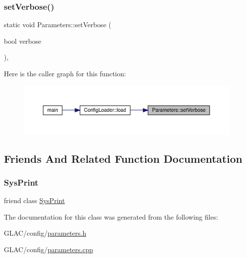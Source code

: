 \subsubsection{\texorpdfstring{setVerbose()}{setVerbose()}}
{\footnotesize\ttfamily static void Parameters\+::set\+Verbose (\begin{DoxyParamCaption}\item[{bool}]{verbose }\end{DoxyParamCaption})\hspace{0.3cm}{\ttfamily [inline]}, {\ttfamily [static]}}

Here is the caller graph for this function\+:\nopagebreak
\begin{figure}[H]
\begin{center}
\leavevmode
\includegraphics[width=350pt]{class_parameters_aa0ac9d09db506844758e0a5d23dedeb4_icgraph}
\end{center}
\end{figure}


\subsection{Friends And Related Function Documentation}
\mbox{\label{class_parameters_aa0fdc1e103aea3a32f97ca2009dda3e6}} 
\subsubsection{\texorpdfstring{SysPrint}{SysPrint}}
{\footnotesize\ttfamily friend class \mbox{\hyperlink{class_sys_print}{Sys\+Print}}\hspace{0.3cm}{\ttfamily [friend]}}



The documentation for this class was generated from the following files\+:\begin{DoxyCompactItemize}
\item 
G\+L\+A\+C/config/\mbox{\hyperlink{parameters_8h}{parameters.\+h}}\item 
G\+L\+A\+C/config/\mbox{\hyperlink{parameters_8cpp}{parameters.\+cpp}}\end{DoxyCompactItemize}
